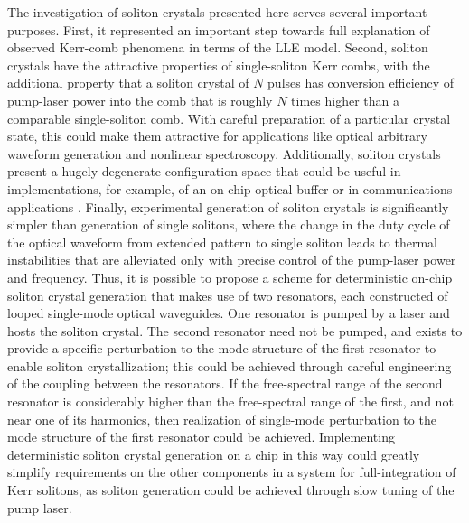The investigation of soliton crystals presented here serves several important purposes. First, it represented an important step towards full explanation of observed Kerr-comb phenomena in terms of the LLE model.  Second, soliton crystals have the attractive properties of single-soliton Kerr combs, with the additional property that a soliton crystal of $N$ pulses has conversion efficiency of pump-laser power into the comb that is roughly $N$ times higher than a comparable single-soliton comb. With careful preparation of a particular crystal state, this could make them attractive for applications like optical arbitrary waveform generation and nonlinear spectroscopy. Additionally, soliton crystals present a hugely degenerate configuration space that could be useful in implementations, for example, of an on-chip optical buffer or in communications applications \cite{Leo2010a}. Finally, experimental generation of soliton crystals is significantly simpler than generation of single solitons, where the change in the duty cycle of the optical waveform from extended pattern to single soliton leads to thermal instabilities that are alleviated only with precise control of the pump-laser power and frequency. Thus, it is possible to propose a scheme for deterministic on-chip soliton crystal generation that makes use of two resonators, each constructed of looped single-mode optical waveguides. One resonator is pumped by a laser and hosts the soliton crystal. The second resonator need not be pumped, and exists to provide a specific perturbation to the mode structure of the first resonator to enable soliton crystallization; this could be achieved through careful engineering of the coupling between the resonators. If the free-spectral range of the second resonator is considerably higher than the free-spectral range of the first, and not near one of its harmonics, then realization of single-mode perturbation to the mode structure of the first resonator could be achieved. Implementing deterministic soliton crystal generation on a chip in this way could greatly simplify requirements on the other components in a system for full-integration of Kerr solitons, as soliton generation could be achieved through slow tuning of the pump laser.

